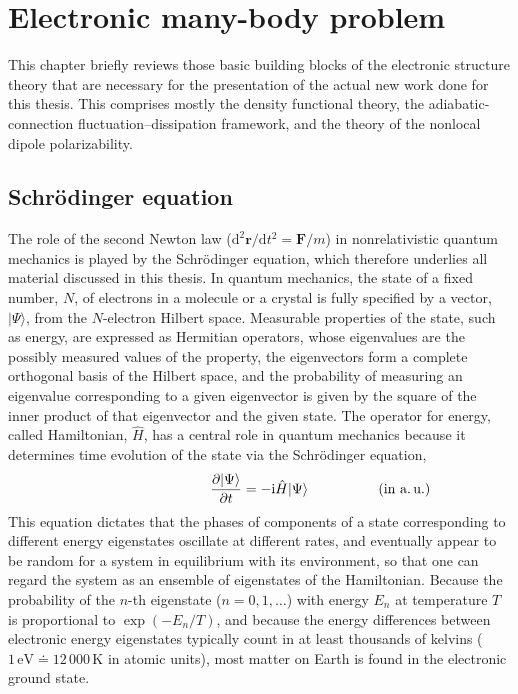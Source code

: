 \chapter{Electronic many-body problem}\label{chap:electrons}

{\sffamily This chapter briefly reviews those basic building blocks of the electronic structure theory that are necessary for the presentation of the actual new work done for this thesis.
This comprises mostly the density functional theory, the adiabatic-connection fluctuation--dissipation framework, and the theory of the nonlocal dipole polarizability.
}

\section{Schrödinger equation}

The role of the second Newton law ($\mathrm d^2\mathbf r/\mathrm dt^2=\mathbf F/m$) in nonrelativistic quantum mechanics is played by the Schrödinger equation, which therefore underlies all material discussed in this thesis.
In quantum mechanics, the state of a fixed number, $N$, of electrons in a molecule or a crystal is fully specified by a vector, $|\Psi\rangle$, from the $N$-electron Hilbert space.
Measurable properties of the state, such as energy, are expressed as Hermitian operators, whose eigenvalues are the possibly measured values of the property, the eigenvectors form a complete orthogonal basis of the Hilbert space, and the probability of measuring an eigenvalue corresponding to a given eigenvector is given by the square of the inner product of that eigenvector and the given state.
The operator for energy, called Hamiltonian, $\hat H$, has a central role in quantum mechanics because it determines time evolution of the state via the Schrödinger equation,
\begin{equation}
  \frac{\partial|\Psi\rangle}{\partial t}=-\mathrm i\hat H|\Psi\rangle
  \makebox[0pt]{\hspace{0.4\linewidth}(in a.\,u.)}
  \label{eq:schrodinger-time}
\end{equation}
This equation dictates that the phases of components of a state corresponding to different energy eigenstates oscillate at different rates, and eventually appear to be random for a system in equilibrium with its environment, so that one can regard the system as an ensemble of eigenstates of the Hamiltonian.
Because the probability of the $n$-th eigenstate ($n=0,1,\ldots$) with energy $E_n$ at temperature $T$ is proportional to $\exp(-E_n/T)$, and because the energy differences between electronic energy eigenstates typically count in at least thousands of kelvins ($1\,\mathrm{eV}\doteq12\,000\,\mathrm{K}$ in atomic units), most matter on Earth is found in the electronic ground state.

